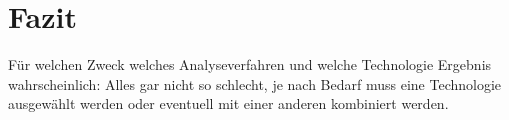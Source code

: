 \documentclass[runningheads,a4paper]{llncs}
\begin{document}
\section{Fazit}
Für welchen Zweck welches Analyseverfahren und welche Technologie
Ergebnis wahrscheinlich: Alles gar nicht so schlecht, je nach Bedarf muss eine Technologie ausgewählt werden oder eventuell mit einer anderen kombiniert werden.




\clearpage

\end{document}

